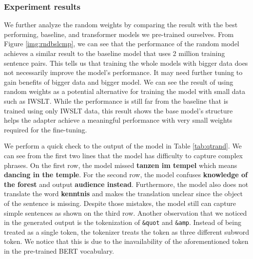 \subsubsection{Experiment results}
We further analyze the random weights by comparing the result with the best performing, baseline, and transformer models we pre-trained ourselves. From Figure \ref{img:rndbslcmp}, we can see that the performance of the random model achieves a similar result to the baseline model that uses 2 million training sentence pairs.
This tells us that training the whole models with bigger data does not necessarily improve the model's performance. It may need further tuning to gain benefits of bigger data and bigger model. We can see the result of using random weights as a potential alternative for training the model with small data such as IWSLT.
While the performance is still far from the baseline that is trained using only IWSLT data, this result shows the base model's structure helps the adapter achieve a meaningful performance with very small weights required for the fine-tuning.

We perform a quick check to the output of the model in Table \ref{tab:qtrand}. We can see from the first two lines that the model has difficulty to capture complex phrases. On the first row, the model missed \textbf{tanzen im tempel} which means \textbf{dancing in the temple}. For the second row, the model confuses \textbf{knowledge of the forest} and output \textbf{audience instead}. Furthermore, the model also does not translate the word \textbf{kenntnis} and makes the translation unclear since the object of the sentence is missing. Despite those mistakes, the model still can capture simple sentences as shown on the third row. Another observation that we noticed in the generated output is the tokenization of \texttt{\&quot\;} and \texttt{\&amp\;}. Instead of being treated as a single token, the tokenizer treats the token as three different subword token. We notice that this is due to the inavailability of the aforementioned token in the pre-trained BERT vocabulary.


